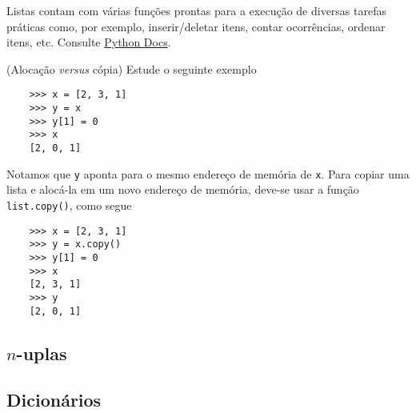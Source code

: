 \documentclass[12pt]{article}
\begin{document}
\begin{obs}
  Listas contam com várias funções prontas para a execução de diversas tarefas práticas como, por exemplo, inserir/deletar itens, contar ocorrências, ordenar itens, etc. Consulte \href{https://docs.python.org/3/tutorial/datastructures.html#more-on-lists}{Python Docs}.
\end{obs}

\begin{obs}(Alocação {\it versus} cópia)
  Estude o seguinte exemplo
  \begin{lstlisting}
    >>> x = [2, 3, 1]
    >>> y = x
    >>> y[1] = 0
    >>> x
    [2, 0, 1]
  \end{lstlisting}
  Notamos que \lstinline+y+ aponta para o mesmo endereço de memória de \lstinline+x+. Para copiar uma lista e alocá-la em um novo endereço de memória, deve-se usar a função \lstinline+list.copy()+, como segue
  \begin{lstlisting}
    >>> x = [2, 3, 1]
    >>> y = x.copy()
    >>> y[1] = 0
    >>> x
    [2, 3, 1]
    >>> y
    [2, 0, 1]
  \end{lstlisting}
\end{obs}

\begin{exr}
  \emconstrucao
\end{exr}

\subsection{$n$-uplas}

\emconstrucao

\subsection{Dicionários}

\emconstrucao


\nocite{*}
% 

\end{document}
